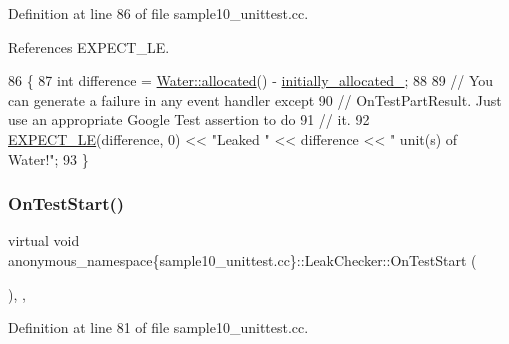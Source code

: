 Definition at line 86 of file sample10\+\_\+unittest.\+cc.



References E\+X\+P\+E\+C\+T\+\_\+\+LE.


\begin{DoxyCode}
86                                             \{
87     \textcolor{keywordtype}{int} difference = \hyperlink{classanonymous__namespace_02sample10__unittest_8cc_03_1_1Water_aa9c7c691e2b1c95aaf3da3652d7b21fc}{Water::allocated}() - \hyperlink{classanonymous__namespace_02sample10__unittest_8cc_03_1_1LeakChecker_aa049de02dffd92c4b31d2c4964d9091f}{initially\_allocated\_};
88 
89     \textcolor{comment}{// You can generate a failure in any event handler except}
90     \textcolor{comment}{// OnTestPartResult. Just use an appropriate Google Test assertion to do}
91     \textcolor{comment}{// it.}
92     \hyperlink{gtest_8h_ae0f265632323b4a07b585dcfde10f60a}{EXPECT\_LE}(difference, 0) << \textcolor{stringliteral}{"Leaked "} << difference << \textcolor{stringliteral}{" unit(s) of Water!"};
93   \}
\end{DoxyCode}
\mbox{\label{classanonymous__namespace_02sample10__unittest_8cc_03_1_1LeakChecker_a7043434f443b9f39f9bbbccf07636809}} 
\subsubsection{\texorpdfstring{On\+Test\+Start()}{OnTestStart()}}
{\footnotesize\ttfamily virtual void anonymous\+\_\+namespace\{sample10\+\_\+unittest.\+cc\}\+::Leak\+Checker\+::\+On\+Test\+Start (\begin{DoxyParamCaption}\item[{const Test\+Info \&}]{ }\end{DoxyParamCaption})\hspace{0.3cm}{\ttfamily [inline]}, {\ttfamily [private]}, {\ttfamily [virtual]}}



Definition at line 81 of file sample10\+\_\+unittest.\+cc.


